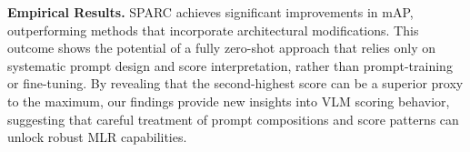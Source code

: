 \noindent \textbf{Empirical Results.} SPARC achieves significant improvements in mAP, outperforming methods that incorporate architectural modifications. This outcome shows the potential of a fully zero-shot approach that relies only on systematic prompt design and score interpretation, rather than prompt-training or fine-tuning. By revealing that the second-highest score can be a superior proxy to the maximum, our findings provide new insights into VLM scoring behavior, suggesting that careful treatment of prompt compositions and score patterns can unlock robust MLR capabilities.

